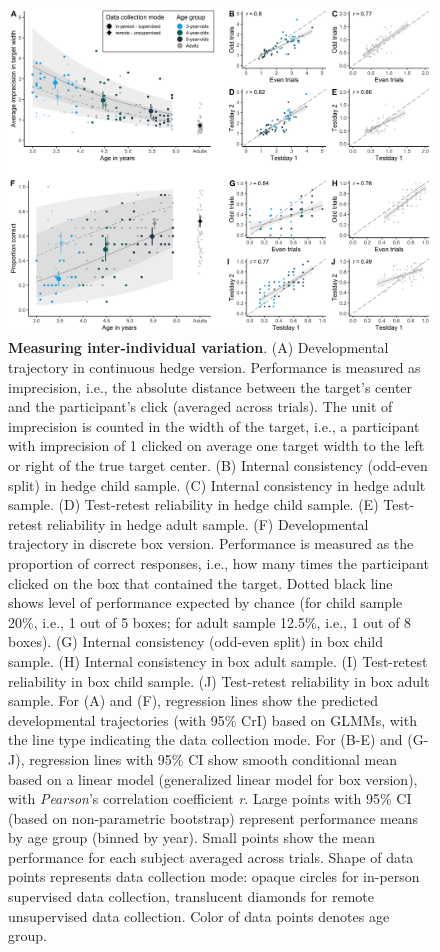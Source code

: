 \documentclass[
  man,floatsintext]{apa6}
\begin{document}
\begin{figure}

{\centering \includegraphics[width=1\linewidth]{../figures/gafo_arrangedplot} 

}

\caption{\textbf{Measuring inter-individual variation}. (A) Developmental trajectory in continuous hedge version. Performance is measured as imprecision, i.e., the absolute distance between the target's center and the participant's click (averaged across trials). The unit of imprecision is counted in the width of the target, i.e., a participant with imprecision of 1 clicked on average one target width to the left or right of the true target center. (B) Internal consistency (odd-even split) in hedge child sample. (C) Internal consistency in hedge adult sample. (D) Test-retest reliability in hedge child sample. (E) Test-retest reliability in hedge adult sample. (F) Developmental trajectory in discrete box version. Performance is measured as the proportion of correct responses, i.e., how many times the participant clicked on the box that contained the target. Dotted black line shows level of performance expected by chance (for child sample 20\%, i.e., 1 out of 5 boxes; for adult sample 12.5\%, i.e., 1 out of 8 boxes). (G) Internal consistency (odd-even split) in box child sample. (H) Internal consistency in box adult sample. (I) Test-retest reliability in box child sample. (J) Test-retest reliability in box adult sample. For (A) and (F), regression lines show the predicted developmental trajectories (with 95\% CrI) based on GLMMs, with the line type indicating the data collection mode. For (B-E) and (G-J), regression lines with 95\% CI show smooth conditional mean based on a linear model (generalized linear model for box version), with \emph{Pearson}'s correlation coefficient \emph{r}. Large points with 95\% CI (based on non-parametric bootstrap) represent performance means by age group (binned by year). Small points show the mean performance for each subject averaged across trials. Shape of data points represents data collection mode: opaque circles for in-person supervised data collection, translucent diamonds for remote unsupervised data collection. Color of data points denotes age group.}\label{fig:fig2}
\end{figure}
\end{document}
